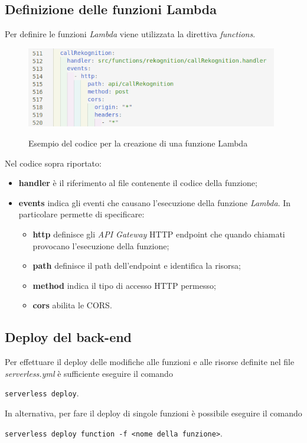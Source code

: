 	\subsection{Definizione delle funzioni Lambda}
	Per definire le funzioni \emph{Lambda} viene utilizzata la direttiva \emph{functions}. 
	
	\begin{figure}[H]
		\centering
		\includegraphics[width=11cm]{immagini/lambda.png} \\
		\caption{\label{fig:lambda} Esempio del codice per la creazione di una funzione Lambda}
	\end{figure}

	Nel codice sopra riportato:
	\begin{itemize}
		\item \textbf{handler} è il riferimento al file contenente il codice della funzione; 
		\item \textbf{events} indica gli eventi che causano l'esecuzione della funzione \emph{Lambda}. In particolare permette di specificare:
		\begin{itemize}
			\item \textbf{http} definisce gli \emph{API Gateway} HTTP endpoint che quando chiamati provocano l'esecuzione della funzione;
			\item \textbf{path} definisce il path dell'endpoint e identifica la risorsa;
			\item \textbf{method} indica il tipo di accesso HTTP permesso;
			\item \textbf{cors} abilita le \gls{CORS}.
		\end{itemize}
		 
	\end{itemize}
	
	\subsection{Deploy del back-end}
	Per effettuare il \gls{deploy} delle modifiche alle funzioni e alle risorse definite nel file \emph{serverless.yml} è sufficiente eseguire il comando
	\begin{center}
		\texttt{serverless deploy}.
	\end{center} 
	In alternativa, per fare il \gls{deploy} di singole funzioni è possibile eseguire il comando 
	\begin{center}
		\texttt{serverless deploy function -f <nome della funzione>}.
	\end{center}

